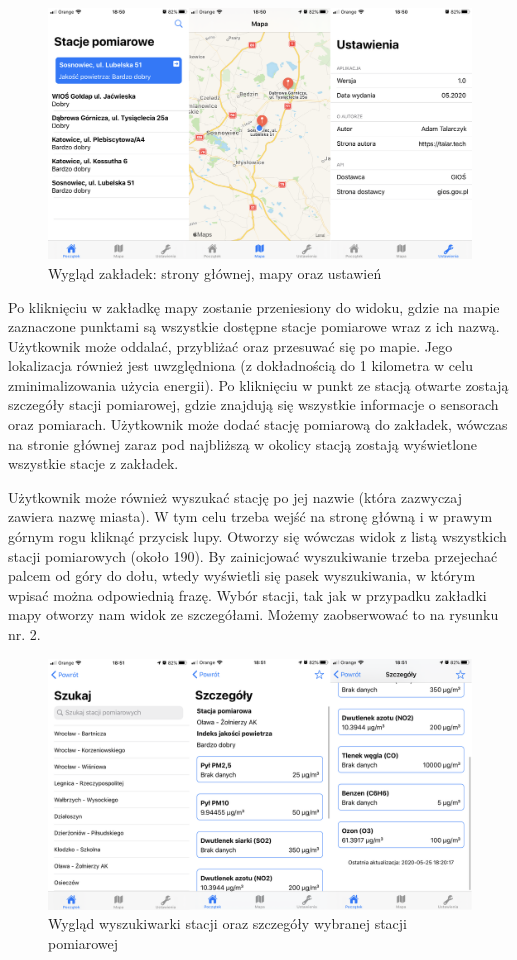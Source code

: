 \documentclass[a4paper,11pt,titlepage]{article}
\begin{document}
\begin{figure}[H]
\centering
\includegraphics[width=1\columnwidth]{img/img1.PNG}
\caption{Wygląd zakładek: strony głównej, mapy oraz ustawień} 
\end{figure}

Po kliknięciu w zakładkę mapy zostanie przeniesiony do widoku, gdzie na mapie zaznaczone punktami są wszystkie dostępne stacje pomiarowe wraz z ich nazwą. Użytkownik może oddalać, przybliżać oraz przesuwać się po mapie. Jego lokalizacja również jest uwzględniona (z dokładnością do 1 kilometra w celu zminimalizowania użycia energii). Po kliknięciu w punkt ze stacją otwarte zostają szczegóły stacji pomiarowej, gdzie znajdują się wszystkie informacje o sensorach oraz pomiarach. Użytkownik może dodać stację pomiarową do zakładek, wówczas na stronie głównej zaraz pod najbliższą w okolicy stacją zostają wyświetlone wszystkie stacje z zakładek.

Użytkownik może również wyszukać stację po jej nazwie (która zazwyczaj zawiera nazwę miasta). W tym celu trzeba wejść na stronę główną i w prawym górnym rogu kliknąć przycisk lupy. Otworzy się wówczas widok z listą wszystkich stacji pomiarowych (około 190). By zainicjować wyszukiwanie trzeba przejechać palcem od góry do dołu, wtedy wyświetli się pasek wyszukiwania, w którym wpisać można odpowiednią frazę. Wybór stacji, tak jak w przypadku zakładki mapy otworzy nam widok ze szczegółami. Możemy zaobserwować to na rysunku nr. 2.

\begin{figure}[H]
\centering
\includegraphics[width=1\columnwidth]{img/img2.PNG}
\caption{Wygląd wyszukiwarki stacji oraz szczegóły wybranej stacji pomiarowej} 
\end{figure}
\end{document}

